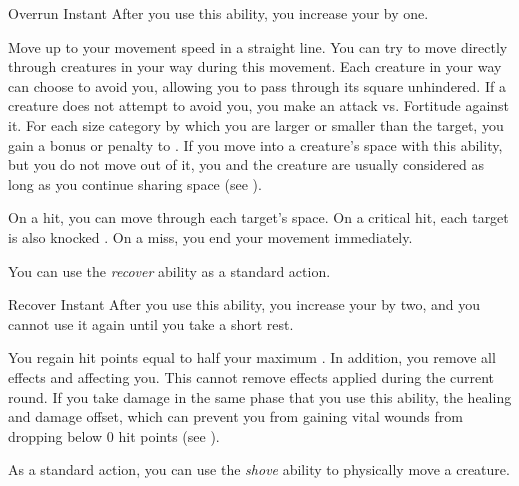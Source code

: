         \begin{instantability}{Overrun}
            \label{Overrun}
            Instant
            \rankline
            After you use this ability, you increase your  by one.

            Move up to your movement speed in a straight line.
            You can try to move directly through creatures in your way during this movement.
            Each creature in your way can choose to avoid you, allowing you to pass through its square unhindered.
            If a creature does not attempt to avoid you, you make an attack vs. Fortitude against it.
            For each size category by which you are larger or smaller than the target, you gain a  bonus or penalty to .
            If you move into a creature's space with this ability, but you do not move out of it, you and the creature are usually considered \squeezing as long as you continue sharing space (see ).

            On a hit, you can move through each target's space.
            On a critical hit, each target is also knocked \prone.
            On a miss, you end your movement immediately.
        \end{instantability}

         You can use the \textit{recover} ability as a standard action.
        \begin{instantability}{Recover}
            \label{Recover}
            Instant
            \rankline
            After you use this ability, you increase your  by two, and you cannot use it again until you take a short rest.

            You regain hit points equal to half your maximum .
            In addition, you remove all  effects and  affecting you.
            This cannot remove effects applied during the current round.
            If you take damage in the same phase that you use this ability, the healing and damage offset, which can prevent you from gaining vital wounds from dropping below 0 hit points (see ).
        \end{instantability}

         As a standard action, you can use the \textit{shove} ability to physically move a creature.

